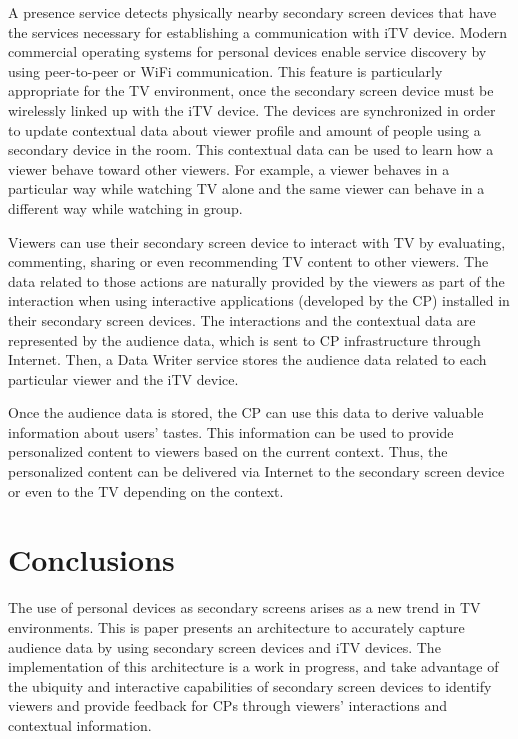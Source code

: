 \documentclass[conference,a4paper]{IEEEtran}
\begin{document}
A presence service detects physically nearby secondary screen devices that have the services necessary for establishing a communication with iTV device. Modern commercial operating systems for personal devices enable service discovery by using peer-to-peer or WiFi communication. This feature is particularly appropriate for the TV environment, once the secondary screen device must be wirelessly linked up with the iTV device. The devices are synchronized in order to update contextual data about viewer profile and amount of people using a secondary device in the room. This contextual data can be used to learn how a viewer behave toward other viewers. For example, a viewer behaves in a particular way while watching TV alone and the same viewer can behave in a different way while watching in group.

Viewers can use their secondary screen device to interact with TV by evaluating, commenting, sharing or even recommending TV content to other viewers. The data related to those actions are naturally provided by the viewers as part of the interaction when using interactive applications (developed by the CP) installed in their secondary screen devices. The interactions and the contextual data are represented by the audience data, which is sent to CP infrastructure through Internet. Then, a Data Writer service stores the audience data related to each particular viewer and the iTV device.

Once the audience data is stored, the CP can use this data to derive valuable information about users' tastes. This information can be used to provide personalized content to viewers based on the current context. Thus, the personalized content can be delivered via Internet to the secondary screen device or even to the TV depending on the context.

\section{Conclusions}

The use of personal devices as secondary screens arises as a new trend in TV environments. This is paper presents an architecture to accurately capture audience data by using secondary screen devices and iTV devices. The implementation of this architecture is a work in progress, and take advantage of the ubiquity and interactive capabilities of secondary screen devices to identify viewers and provide feedback for CPs through viewers' interactions and contextual information. 
\end{document}
